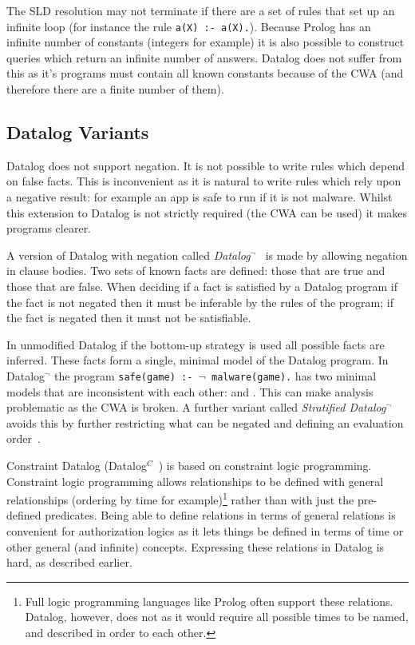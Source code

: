 \documentclass[thesis.tex]{subfiles}
\begin{document}
The SLD resolution may not terminate if there are a set of rules that
set up an infinite loop (for instance the rule \lstinline!a(X) :- a(X).!).
Because Prolog has an infinite number of constants (integers
for example) it is also possible to construct queries which return an
infinite number of answers. Datalog does not suffer from this as it's
programs must contain all known constants because of the \ac{CWA} (and
therefore there are a finite number of them).


\subsection{Datalog Variants}

Datalog does not support negation. It is not possible to write
rules which depend on false facts.  This is inconvenient as it is
natural to write rules which rely upon a negative result: for example
an app is safe to run if it is not malware.  Whilst this extension to Datalog is
not strictly required (the \ac{CWA} can be used) it makes programs clearer.

A version of Datalog with negation called
\emph{Datalog$^\lnot$}~\cite{ceri_what_1989} is made by allowing negation in clause
bodies. Two sets of known facts are defined: those that are true and those that
are false.  When deciding if a fact is satisfied by a Datalog program if the
fact is not negated then it must be inferable by the rules of the program; if
the fact is negated then it must not be satisfiable.  

In unmodified Datalog if the bottom-up strategy
is used all possible facts are inferred. These facts form a single, minimal
model of the Datalog program.  In Datalog$^\lnot$ the program \texttt{safe(game)
:- $\mathsf\lnot$ malware(game).} has two minimal models that are inconsistent
with each other:  and .  This can make
analysis problematic as the \ac{CWA} is broken. A further variant called
\emph{Stratified Datalog$^\lnot$} avoids this by further restricting what can be
negated and defining an evaluation order~\cite{minker_foundations_2014}.

Constraint Datalog (Datalog$^C$~\cite{li_datalog_2003}) is based
on constraint logic programming.  Constraint logic programming allows
relationships to be defined with general relationships (ordering by time
for example)\footnote{Full logic programming languages like Prolog often
support these relations. Datalog, however, does not as it would require all
possible times to be named, and described in order to each other.} rather than with just the pre-defined predicates.  Being able to
define relations in terms of general relations is convenient for
authorization logics as it lets things be defined in terms of time or
other general (and infinite) concepts. 
Expressing these relations in Datalog is hard, as described earlier.
\end{document}
